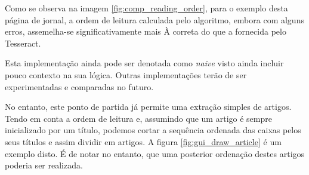 Como se observa na imagem \ref{fig:comp_reading_order}, para o exemplo desta página de jornal, a ordem de leitura calculada pelo algoritmo, embora com alguns erros, assemelha-se significativamente mais À correta do que a fornecida pelo Tesseract.



Esta implementação ainda pode ser denotada como \textit{naive} visto ainda incluir pouco contexto na sua lógica. Outras implementações terão de ser experimentadas e comparadas no futuro.

No entanto, este ponto de partida já permite uma extração simples de artigos. Tendo em conta a ordem de leitura e, assumindo que um artigo é sempre inicializado por um título, podemos cortar a sequência ordenada das caixas pelos seus títulos e assim dividir em artigos. A figura \ref{fig:gui_draw_article} é um exemplo disto. É de notar no entanto, que uma posterior ordenação destes artigos poderia ser realizada.
